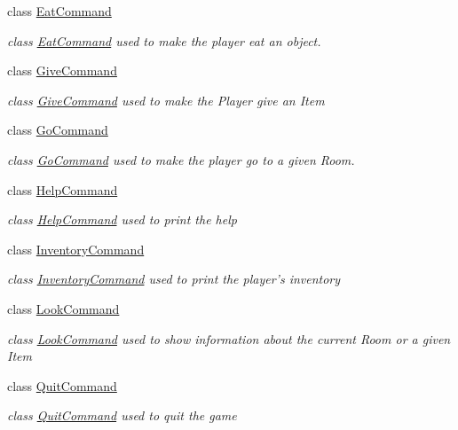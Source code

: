 \begin{DoxyCompactItemize}
class \hyperlink{classpkg__commands_1_1EatCommand}{Eat\-Command}
\begin{DoxyCompactList}\small\item\em class \hyperlink{classpkg__commands_1_1EatCommand}{Eat\-Command} used to make the player eat an object. \end{DoxyCompactList}\item 
class \hyperlink{classpkg__commands_1_1GiveCommand}{Give\-Command}
\begin{DoxyCompactList}\small\item\em class \hyperlink{classpkg__commands_1_1GiveCommand}{Give\-Command} used to make the Player give an Item \end{DoxyCompactList}\item 
class \hyperlink{classpkg__commands_1_1GoCommand}{Go\-Command}
\begin{DoxyCompactList}\small\item\em class \hyperlink{classpkg__commands_1_1GoCommand}{Go\-Command} used to make the player go to a given Room. \end{DoxyCompactList}\item 
class \hyperlink{classpkg__commands_1_1HelpCommand}{Help\-Command}
\begin{DoxyCompactList}\small\item\em class \hyperlink{classpkg__commands_1_1HelpCommand}{Help\-Command} used to print the help \end{DoxyCompactList}\item 
class \hyperlink{classpkg__commands_1_1InventoryCommand}{Inventory\-Command}
\begin{DoxyCompactList}\small\item\em class \hyperlink{classpkg__commands_1_1InventoryCommand}{Inventory\-Command} used to print the player's inventory \end{DoxyCompactList}\item 
class \hyperlink{classpkg__commands_1_1LookCommand}{Look\-Command}
\begin{DoxyCompactList}\small\item\em class \hyperlink{classpkg__commands_1_1LookCommand}{Look\-Command} used to show information about the current Room or a given Item \end{DoxyCompactList}\item 
class \hyperlink{classpkg__commands_1_1QuitCommand}{Quit\-Command}
\begin{DoxyCompactList}\small\item\em class \hyperlink{classpkg__commands_1_1QuitCommand}{Quit\-Command} used to quit the game \end{DoxyCompactList}\item 

\end{DoxyCompactItemize}
